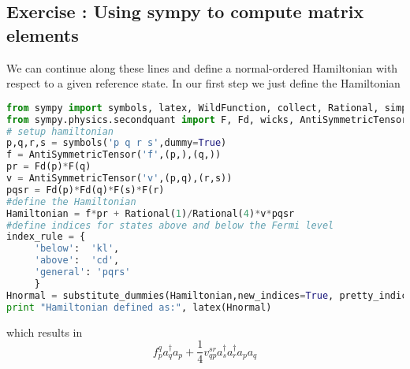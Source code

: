 \documentclass[graybox,sectrefs,envcountresetchap,open=right]{svmonodo}
\newenvironment{doconceexercise}{}{}
\newcounter{doconceexercisecounter}
\begin{document}
\begin{doconceexercise}

\subsection*{Exercise \thedoconceexercisecounter: Using sympy to compute matrix elements}


We can continue along these lines and define a normal-ordered Hamiltonian with respect to a given reference state.
In our first step we just define the Hamiltonian
\begin{lstlisting}[language=Python,style=blue1bar]
from sympy import symbols, latex, WildFunction, collect, Rational, simplify
from sympy.physics.secondquant import F, Fd, wicks, AntiSymmetricTensor, substitute_dummies, NO, evaluate_deltas
# setup hamiltonian
p,q,r,s = symbols('p q r s',dummy=True)
f = AntiSymmetricTensor('f',(p,),(q,))
pr = Fd(p)*F(q)
v = AntiSymmetricTensor('v',(p,q),(r,s))
pqsr = Fd(p)*Fd(q)*F(s)*F(r)
#define the Hamiltonian
Hamiltonian = f*pr + Rational(1)/Rational(4)*v*pqsr
#define indices for states above and below the Fermi level
index_rule = {
     'below':  'kl',
     'above':  'cd',
     'general': 'pqrs'
     }
Hnormal = substitute_dummies(Hamiltonian,new_indices=True, pretty_indices=index_rule)
print "Hamiltonian defined as:", latex(Hnormal)
\end{lstlisting}
which results in
\[
f^{q}_{p} a^\dagger_{q} a_{p} + \frac{1}{4} v^{sr}_{qp} a^\dagger_{s} a^\dagger_{r} a_{p} a_{q}
\]

\end{doconceexercise}
\end{document}
